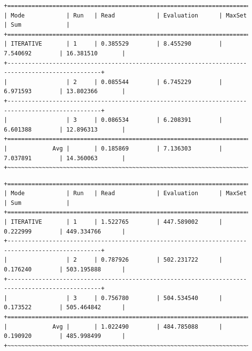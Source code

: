 \documentclass[draft,final]{vutinfth} %
\begin{document}
\begin{lstlisting}[basicstyle=\tiny,caption={Benchmark ITERATIVE, Datei: lubm-ex-20-15.sparql.xml},label={lst:bi15}]
+=================================================================================================+
| Mode            | Run   | Read            | Evaluation      | MaxSet          | Sum             | 
+=================================================================================================+
| ITERATIVE       | 1     | 0.385529        | 8.455290        | 7.540692        | 16.381510       | 
+-------------------------------------------------------------------------------------------------+
|                 | 2     | 0.085544        | 6.745229        | 6.971593        | 13.802366       | 
+-------------------------------------------------------------------------------------------------+
|                 | 3     | 0.086534        | 6.208391        | 6.601388        | 12.896313       | 
+=================================================================================================+
|             Avg |       | 0.185869        | 7.136303        | 7.037891        | 14.360063       |
+~~~~~~~~~~~~~~~~~~~~~~~~~~~~~~~~~~~~~~~~~~~~~~~~~~~~~~~~~~~~~~~~~~~~~~~~~~~~~~~~~~~~~~~~~~~~~~~~~+
\end{lstlisting}

\begin{lstlisting}[basicstyle=\tiny,caption={Benchmark ITERATIVE, Datei: lubm-ex-20-17.sparql.xml},label={lst:bi17}]
+=================================================================================================+
| Mode            | Run   | Read            | Evaluation      | MaxSet          | Sum             | 
+=================================================================================================+
| ITERATIVE       | 1     | 1.522765        | 447.589002      | 0.222999        | 449.334766      | 
+-------------------------------------------------------------------------------------------------+
|                 | 2     | 0.787926        | 502.231722      | 0.176240        | 503.195888      | 
+-------------------------------------------------------------------------------------------------+
|                 | 3     | 0.756780        | 504.534540      | 0.173522        | 505.464842      | 
+=================================================================================================+
|             Avg |       | 1.022490        | 484.785088      | 0.190920        | 485.998499      |
+~~~~~~~~~~~~~~~~~~~~~~~~~~~~~~~~~~~~~~~~~~~~~~~~~~~~~~~~~~~~~~~~~~~~~~~~~~~~~~~~~~~~~~~~~~~~~~~~~+
\end{lstlisting}
\end{document}
